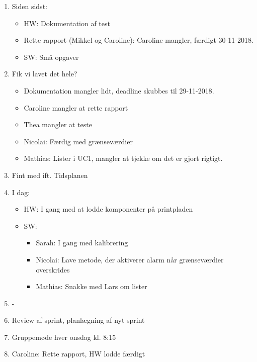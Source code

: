 \begin{enumerate}
	\item Siden sidst:
	\begin{itemize}
		\item HW: Dokumentation af test
		\item Rette rapport (Mikkel og Caroline): Caroline mangler, færdigt 30-11-2018.
		\item SW: Små opgaver
	\end{itemize}
	\item Fik vi lavet det hele?
	\begin{itemize}
		\item Dokumentation mangler lidt, deadline skubbes til 29-11-2018.
		\item Caroline mangler at rette rapport
		\item Thea mangler at teste
		\item Nicolai: Færdig med grænseværdier
		\item Mathias: Lister i UC1, mangler at tjekke om det er gjort rigtigt.
	\end{itemize}
	\item Fint med ift. Tidsplanen
	\item I dag:
	\begin{itemize}
		\item HW: I gang med at lodde komponenter på printpladen
		\item SW:
		\begin{itemize}
			\item Sarah: I gang med kalibrering
			\item Nicolai: Lave metode, der aktiverer alarm når grænseværdier overskrides
			\item Mathias: Snakke med Lars om lister
		\end{itemize}
	\end{itemize}
	\item -
	\item Review af sprint, planlægning af nyt sprint
	\item Gruppemøde hver onsdag kl. 8:15
	\item Caroline: Rette rapport, HW lodde færdigt
\end{enumerate}

\clearpage